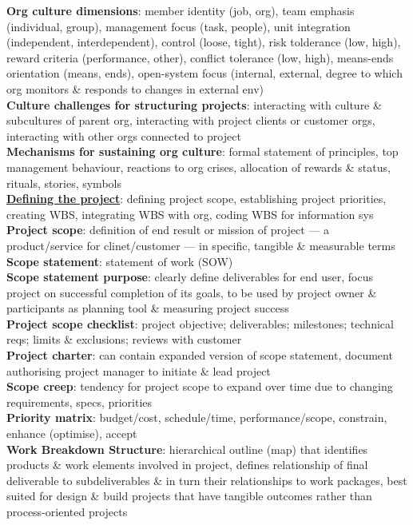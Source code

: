 \documentclass[a4paper]{article}
\begin{document}
\begin{multicols}{2}
        \textbf{Org culture dimensions}: member identity (job, org), team emphasis (individual, group), management focus (task, people), unit integration (independent, interdependent), control (loose, tight), risk tolderance (low, high), reward criteria (performance, other), conflict tolerance (low, high), means-ends orientation (means, ends), open-system focus (internal, external, degree to which org monitors \& responds to changes in external env)\\
        \textbf{Culture challenges for structuring projects}: interacting with culture \& subcultures of parent org, interacting with project clients or customer orgs, interacting with other orgs connected to project\\
        \textbf{Mechanisms for sustaining org culture}: formal statement of principles, top management behaviour, reactions to org crises, allocation of rewards \& status, rituals, stories, symbols\\
        \underline{\textbf{Defining the project}}: defining project scope, establishing project priorities, creating WBS, integrating WBS with org, coding WBS for information sys\\
        \textbf{Project scope}: definition of end result or mission of project --- a product/service for clinet/customer --- in specific, tangible \& measurable terms\\
        \textbf{Scope statement}: statement of work (SOW)\\
        \textbf{Scope statement purpose}: clearly define deliverables for end user, focus project on successful completion of its goals, to be used by project owner \& participants as planning tool \& measuring project success\\
        \textbf{Project scope checklist}: project objective; deliverables; milestones; technical reqs; limits \& exclusions; reviews with customer\\
        \textbf{Project charter}: can contain expanded version of scope statement, document authorising project manager to initiate \& lead project\\
        \textbf{Scope creep}: tendency for project scope to expand over time due to changing requirements, specs, priorities\\
        \textbf{Priority matrix}: budget/cost, schedule/time, performance/scope, constrain, enhance (optimise), accept\\
        \textbf{Work Breakdown Structure}: hierarchical outline (map) that identifies products \& work elements involved in project, defines relationship of final deliverable to subdeliverables \& in turn their relationships to work packages, best suited for design \& build projects that have tangible outcomes rather than process-oriented projects\\

\end{multicols}
\end{document}
